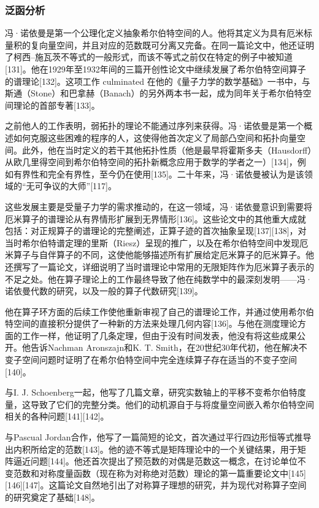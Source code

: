 \subsubsection{泛函分析}  
冯·诺依曼是第一个公理化定义抽象希尔伯特空间的人。他将其定义为具有厄米标量积的复向量空间，并且对应的范数既可分离又完备。在同一篇论文中，他还证明了柯西–施瓦茨不等式的一般形式，而该不等式之前仅在特定的例子中被知道[131]。他在1929年至1932年间的三篇开创性论文中继续发展了希尔伯特空间算子的谱理论[132]。这项工作 culminated 在他的《量子力学的数学基础》一书中，与斯通（Stone）和巴拿赫（Banach）的另外两本书一起，成为同年关于希尔伯特空间理论的首部专著[133]。

之前他人的工作表明，弱拓扑的理论不能通过序列来获得。冯·诺依曼是第一个概述如何克服这些困难的程序的人，这使得他首次定义了局部凸空间和拓扑向量空间。此外，他在当时定义的若干其他拓扑性质（他是最早将霍斯多夫（Hausdorff）从欧几里得空间到希尔伯特空间的拓扑新概念应用于数学的学者之一）[134]，例如有界性和完全有界性，至今仍在使用[135]。二十年来，冯·诺依曼被认为是该领域的“无可争议的大师”[117]。

这些发展主要是受量子力学的需求推动的，在这一领域，冯·诺依曼意识到需要将厄米算子的谱理论从有界情形扩展到无界情形[136]。这些论文中的其他重大成就包括：对正规算子的谱理论的完整阐述，正算子迹的首次抽象呈现[137][138]，对当时希尔伯特谱定理的里斯（Riesz）呈现的推广，以及在希尔伯特空间中发现厄米算子与自伴算子的不同，这使他能够描述所有扩展给定厄米算子的厄米算子。他还撰写了一篇论文，详细说明了当时谱理论中常用的无限矩阵作为厄米算子表示的不足之处。他在算子理论上的工作最终导致了他在纯数学中的最深刻发明——冯·诺依曼代数的研究，以及一般的算子代数研究[139]。

他在算子环方面的后续工作使他重新审视了自己的谱理论工作，并通过使用希尔伯特空间的直接积分提供了一种新的方法来处理几何内容[136]。与他在测度理论方面的工作一样，他证明了几条定理，但由于没有时间发表，他没有将这些成果公开。他告诉Nachman Aronszajn和K. T. Smith，在20世纪30年代初，他在解决不变子空间问题时证明了在希尔伯特空间中完全连续算子存在适当的不变子空间[140]。

与I. J. Schoenberg一起，他写了几篇文章，研究实数轴上的平移不变希尔伯特度量，这导致了它们的完整分类。他们的动机源自于与将度量空间嵌入希尔伯特空间相关的各种问题[141][142]。

与Pascual Jordan合作，他写了一篇简短的论文，首次通过平行四边形恒等式推导出内积所给定的范数[143]。他的迹不等式是矩阵理论中的一个关键结果，用于矩阵逼近问题[144]。他还首次提出了预范数的对偶是范数这一概念，在讨论单位不变范数和对称度量函数（现在称为对称绝对范数）理论的第一篇重要论文中[145][146][147]。这篇论文自然地引出了对称算子理想的研究，并为现代对称算子空间的研究奠定了基础[148]。

